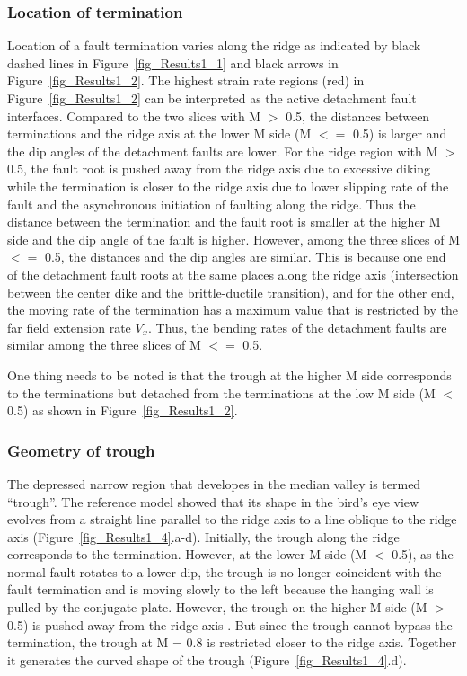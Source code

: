 \documentclass[draft,gc]{agutex}
\begin{document}
\begin{article}
\subsubsection{Location of termination}
Location of a fault termination varies along the ridge as indicated by black dashed lines in Figure~\ref{fig_Results1_1} and black arrows in Figure~\ref{fig_Results1_2}. The highest strain rate regions (red) in Figure~\ref{fig_Results1_2} can be interpreted as the active detachment fault interfaces. Compared to the two slices with M $>$ 0.5, the distances between terminations and the ridge axis at the lower M side (M $<=$ 0.5) is larger and the dip angles of the detachment faults are lower. For the ridge region with M $>$ 0.5, the fault root is pushed away from the ridge axis due to excessive diking while the termination is closer to the ridge axis due to lower slipping rate of the fault and the asynchronous initiation of faulting along the ridge. Thus the distance between the termination and the fault root is smaller at the higher M side and the dip angle of the fault is higher. However, among the three slices of M $<=$ 0.5, the distances and the dip angles are similar. This is because one end of the detachment fault roots at the same places along the ridge axis (intersection between the center dike and the brittle-ductile transition), and for the other end, the moving rate of the termination has a maximum value that is restricted by the far field extension rate $V_{x}$. Thus, the bending rates of the detachment faults are similar among the three slices of M $<=$ 0.5.

One thing needs to be noted is that the trough at the higher M side corresponds to the terminations but detached from the terminations at the low M side (M $<$ 0.5) as shown in Figure~\ref{fig_Results1_2}.

\subsubsection{Geometry of trough}

The depressed narrow region that developes in the median valley is termed ``trough''. The reference model showed that its shape in the bird's eye view evolves from a straight line parallel to the ridge axis to a line oblique to the ridge axis (Figure~\ref{fig_Results1_4}.a-d). Initially, the trough along the ridge corresponds to the termination. However, at the lower M side (M $<$ 0.5), as the normal fault rotates to a lower dip, the trough is no longer coincident with the fault termination and is moving slowly to the left because the hanging wall is pulled by the conjugate plate. However, the trough on the higher M side (M $>$ 0.5) is pushed away from the ridge axis \citep{Tucholke2008}. But since the trough cannot bypass the termination, the trough at M = 0.8 is restricted closer to the ridge axis. Together it generates the curved shape of the trough (Figure~\ref{fig_Results1_4}.d).


\end{article}
\end{document}
